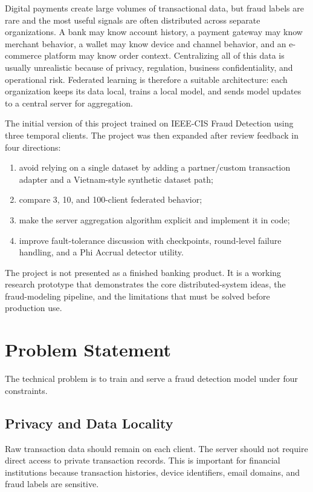 \documentclass[conference]{IEEEtran}
\begin{document}
Digital payments create large volumes of transactional data, but fraud labels
are rare and the most useful signals are often distributed across separate
organizations. A bank may know account history, a payment gateway may know
merchant behavior, a wallet may know device and channel behavior, and an
e-commerce platform may know order context. Centralizing all of this data is
usually unrealistic because of privacy, regulation, business confidentiality,
and operational risk. Federated learning is therefore a suitable architecture:
each organization keeps its data local, trains a local model, and sends model
updates to a central server for aggregation.

The initial version of this project trained on IEEE-CIS Fraud Detection using
three temporal clients. The project was then expanded after review feedback in
four directions:

\begin{enumerate}
  \item avoid relying on a single dataset by adding a partner/custom transaction
        adapter and a Vietnam-style synthetic dataset path;
  \item compare 3, 10, and 100-client federated behavior;
  \item make the server aggregation algorithm explicit and implement it in code;
  \item improve fault-tolerance discussion with checkpoints, round-level failure
        handling, and a Phi Accrual detector utility.
\end{enumerate}

The project is not presented as a finished banking product. It is a working
research prototype that demonstrates the core distributed-system ideas, the
fraud-modeling pipeline, and the limitations that must be solved before
production use.

\section{Problem Statement}

The technical problem is to train and serve a fraud detection model under four
constraints.

\subsection{Privacy and Data Locality}

Raw transaction data should remain on each client. The server should not require
direct access to private transaction records. This is important for financial
institutions because transaction histories, device identifiers, email domains,
and fraud labels are sensitive.
\end{document}

